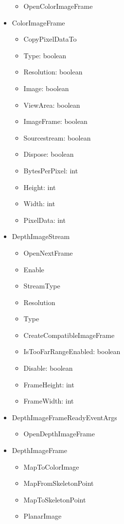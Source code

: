 \documentclass[11pt,a4paper]{article}
\begin{document}
\begin{itemize}
\begin{itemize}
	\item OpenColorImageFrame 	
	\end{itemize}		
\item ColorImageFrame
	\begin{itemize}
	\item CopyPixelDataTo
	\item Type: boolean
	\item Resolution: boolean
	\item Image: boolean
	\item ViewArea: boolean
	\item ImageFrame: boolean
	\item Sourcestream: boolean 
	\item Dispose: boolean
	\item BytesPerPixel: int
	\item Height: int
	\item Width: int
	\item PixelData: int
	\end{itemize}	
\item DepthImageStream
	\begin{itemize}
	\item OpenNextFrame
	\item Enable
	\item StreamType
	\item Resolution	
	\item Type
	\item CreateCompatibleImageFrame
	\item IsTooFarRangeEnabled: boolean
	\item Disable: boolean
	\item FrameHeight: int
	\item FrameWidth: int
	\end{itemize}
\item DepthImageFrameReadyEventArgs
	\begin{itemize}
	\item OpenDepthImageFrame
	\end{itemize}
\item DepthImageFrame
	\begin{itemize}
	\item MapToColorImage
	\item MapFromSkeletonPoint
	\item MapToSkeletonPoint
	\item PlanarImage

\end{itemize}
\end{itemize}
\end{document}
